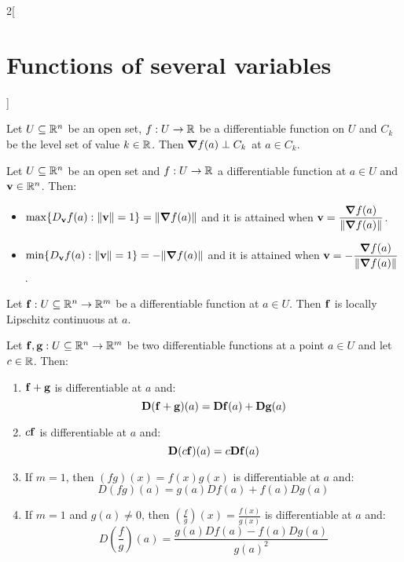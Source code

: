 \documentclass[../../../main.tex]{subfiles}
\begin{document}
\begin{multicols}{2}[\section{Functions of several variables}]
\begin{prop}
    Let $U\subseteq\mathbb{R}^n$ be an open set, $f:U\rightarrow\mathbb{R} $ be a differentiable function on $U$ and $C_k$ be the level set of value $k\in\mathbb{R} $. Then $\grad f(a)\perp C_k$ at $a\in C_k$.
  \end{prop}
  \begin{prop}
    Let $U\subseteq\mathbb{R}^n$ be an open set and $f:U\rightarrow\mathbb{R} $ a differentiable function at $a\in U$ and $\boldsymbol{\mathrm{v}}\in\mathbb{R}^n$. Then:
    \begin{itemize}
      \item $\displaystyle\max\{D_{\boldsymbol{\mathrm{v}}}f(a):\|\boldsymbol{\mathrm{v}}\|=1\}=\|\grad f(a)\|$ and it is attained when $\displaystyle \boldsymbol{\mathrm{v}}=\frac{\grad f(a)}{\|\grad f(a)\|}$.
      \item $\displaystyle\min\{D_{\boldsymbol{\mathrm{v}}}f(a):\|\boldsymbol{\mathrm{v}}\|=1\}=-\|\grad f(a)\|$ and it is attained when $\displaystyle \boldsymbol{\mathrm{v}}=-\frac{\grad f(a)}{\|\grad f(a)\|}$.
    \end{itemize}
  \end{prop}
  \begin{theorem}
    Let $\boldsymbol{\mathrm{f}}:U\subseteq\mathbb{R}^n\rightarrow\mathbb{R}^m$ be a differentiable function at $a\in U$. Then $\boldsymbol{\mathrm{f}}$ is locally Lipschitz continuous at $a$.
  \end{theorem}
  \begin{theorem}
    Let $\boldsymbol{\mathrm{f}},\boldsymbol{\mathrm{g}}:U\subseteq\mathbb{R}^n\to\mathbb{R}^m$ be two differentiable functions at a point $a\in U$ and let $c\in\mathbb{R} $. Then:
    \begin{enumerate}
      \item $\boldsymbol{\mathrm{f}}+\boldsymbol{\mathrm{g}}$ is differentiable at $a$ and: $$\boldsymbol{\mathrm{D}}(\boldsymbol{\mathrm{f}}+\boldsymbol{\mathrm{g}})(a)=\boldsymbol{\mathrm{Df}}(a)+\boldsymbol{\mathrm{Dg}}(a)$$
      \item $c\boldsymbol{\mathrm{f}}$ is differentiable at $a$ and:
            $$\boldsymbol{\mathrm{D}}(c\boldsymbol{\mathrm{f}})(a)=c\boldsymbol{\mathrm{Df}}(a)$$
      \item If $m=1$, then $(fg)(x)=f(x)g(x)$ is differentiable at $a$ and: $$D(fg)(a)=g(a)Df(a)+f(a)Dg(a)$$
      \item If $m=1$ and $g(a)\ne0$, then $\displaystyle\left(\frac{f}{g}\right)(x)=\frac{f(x)}{g(x)}$ is differentiable at $a$ and: $$D\left(\frac{f}{g}\right)(a)=\frac{g(a)Df(a)-f(a)Dg(a)}{{g(a)}^2}$$
    \end{enumerate}
  \end{theorem}
  \begin{theorem}

\end{theorem}
\end{multicols}
\end{document}
